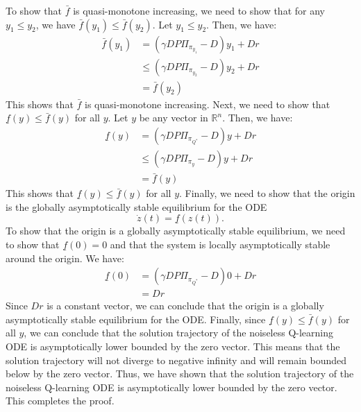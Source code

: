 To show that \( \bar{f} \) is quasi-monotone increasing, we need to show that for any \( y_1 \leq y_2 \), we have \( \bar{f}(y_1) \leq \bar{f}(y_2) \).
Let \( y_1 \leq y_2 \). Then, we have:
\begin{align*}
    \bar{f}(y_1) & = \left(\gamma D P \Pi_{\pi_{y_1}} - D\right) y_1 + D r    \\
                 & \leq \left(\gamma D P \Pi_{\pi_{y_2}} - D\right) y_2 + D r \\
                 & = \bar{f}(y_2)
\end{align*}
This shows that \( \bar{f} \) is quasi-monotone increasing.
Next, we need to show that \( \underline{f}(y) \leq \bar{f}(y) \) for all \( y \).
Let \( y \) be any vector in \( \mathbb{R}^n \).
Then, we have:
\begin{align*}
    \underline{f}(y) & = \left(\gamma D P \Pi_{\pi_{Q^{*}}} - D\right) y + D r \\
                     & \leq \left(\gamma D P \Pi_{\pi_{y}} - D\right) y + D r  \\
                     & = \bar{f}(y)
\end{align*}
This shows that \( \underline{f}(y) \leq \bar{f}(y) \) for all \( y \).
Finally, we need to show that the origin is the globally asymptotically stable equilibrium for the ODE
\[
    \dot{z}(t) = \underline{f}(z(t)) .
\]
To show that the origin is a globally asymptotically stable equilibrium, we need to show that \( \underline{f}(0) = 0 \) and that the system is locally asymptotically stable around the origin.
We have:
\begin{align*}
    \underline{f}(0) & = \left(\gamma D P \Pi_{\pi_{Q^{*}}} - D\right) 0 + D r \\
                     & = D r
\end{align*}
Since \( D r \) is a constant vector, we can conclude that the origin is a globally asymptotically stable equilibrium for the ODE.
Finally, since \( \underline{f}(y) \leq \bar{f}(y) \) for all \( y \), we can conclude that the solution trajectory of the noiseless Q-learning ODE is asymptotically lower bounded by the zero vector.
This means that the solution trajectory will not diverge to negative infinity and will remain bounded below by the zero vector.
Thus, we have shown that the solution trajectory of the noiseless Q-learning ODE is asymptotically lower bounded by the zero vector.
This completes the proof.
